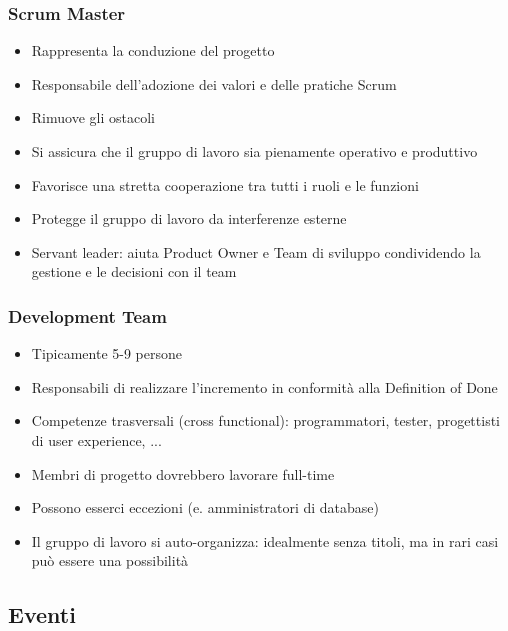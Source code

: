 \subsubsection{Scrum Master}
\begin{itemize}
    \item Rappresenta la conduzione del progetto
    \item Responsabile dell'adozione dei valori e delle pratiche Scrum
    \item Rimuove gli ostacoli
    \item Si assicura che il gruppo di lavoro sia pienamente operativo e produttivo
    \item Favorisce una stretta cooperazione tra tutti i ruoli e le funzioni
    \item Protegge il gruppo di lavoro da interferenze esterne
    \item Servant leader: aiuta Product Owner e Team di sviluppo condividendo la gestione e le decisioni con il team
\end{itemize}

\subsubsection{Development Team}
\begin{itemize}
    \item Tipicamente 5-9 persone
    \item Responsabili di realizzare l'incremento in conformità alla Definition of Done
    \item Competenze trasversali (cross functional): programmatori, tester, progettisti di user experience, ...
    \item Membri di progetto dovrebbero lavorare full-time
    \item Possono esserci eccezioni (e. amministratori di database)
    \item Il gruppo di lavoro si auto-organizza: idealmente senza titoli, ma in rari casi può essere una possibilità
\end{itemize}

\newpage
\subsection{Eventi}

